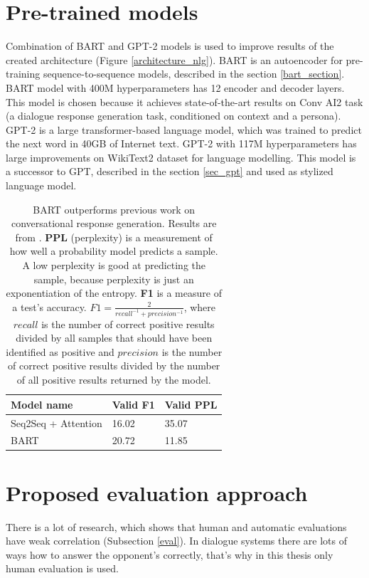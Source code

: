 \section{Pre-trained models}
Combination of BART and GPT-2 models is used to improve results of the created architecture (Figure \ref{architecture_nlg}). BART is an autoencoder for pre-training sequence-to-sequence models, described in the section \ref{bart_section}. BART model with 400M hyperparameters has 12 encoder and decoder layers. This model is chosen because it achieves state-of-the-art results on Conv AI2 task (a dialogue response generation task, conditioned on context and a persona). GPT-2 is a large transformer-based language model, which was trained to predict the next word in 40GB of Internet text. GPT-2 with 117M hyperparameters has large improvements on WikiText2 dataset for language modelling. This model is a successor to GPT, described in the section \ref{sec_gpt} and used as stylized language model. 

\begin{table}[ht]
\centering
 \begin{tabular}{|p{5cm}|p{3cm}|p{3cm}|} 
 \hline
 \textbf{Model name} & \textbf{Valid F1} & \textbf{Valid PPL} \\
 \hline
 Seq2Seq + Attention & 16.02 & 35.07 \\
 \hline
 BART & 20.72 & 11.85 \\
 \hline
 \end{tabular}
 \caption{BART outperforms previous work on conversational response generation. Results are from \cite{lewis2019bart}. \textbf{PPL} (perplexity) is a measurement of how well a probability model predicts a sample. A low perplexity is good at predicting the sample, because perplexity is just an exponentiation of the entropy. \textbf{F1} is a measure of a test's accuracy. $F1 = \frac{2}{recall^{-1} + precision^{-1}}$, where $recall$ is the number of correct positive results divided by all samples that should have been identified as positive and $precision$ is the number of correct positive results divided by the number of all positive results returned by the model.}
\label{tab:bart_statistic}
\end{table}

\section{Proposed evaluation approach}
There is a lot of research, which shows that human and automatic evaluations have weak correlation (Subsection \ref{eval}). In dialogue systems there are lots of ways how to answer the opponent's correctly, that's why in this thesis only human evaluation is used. 

